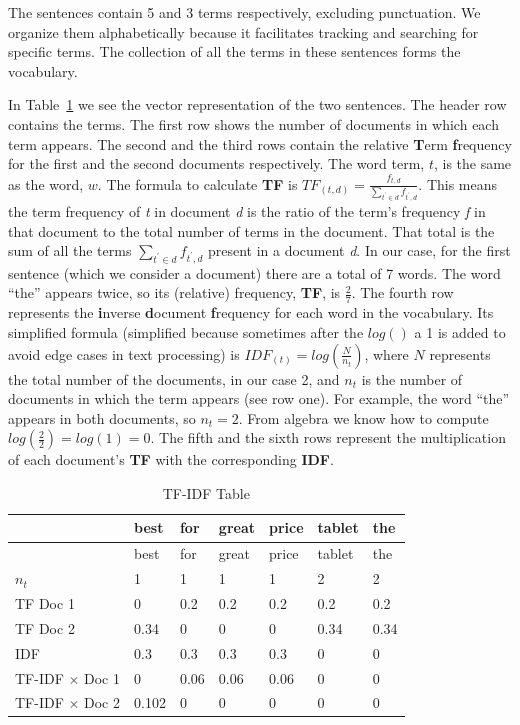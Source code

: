 The sentences contain 5 and 3 terms respectively, excluding punctuation.
We organize them alphabetically because it facilitates tracking and
searching for specific terms. The collection of all the terms in these sentences
forms the vocabulary.

In Table~\ref{tbl-tfidf} we see the vector representation of the two
sentences. The header row contains the terms. The first row shows the
number of documents in which each term appears. The second and the third rows
contain the relative \textbf{T}erm \textbf{f}requency for the first and
the second documents respectively. The word term, \(t\), is the same
as the word, \(w\). The formula to calculate \textbf{TF} is
\(TF_{(t,d)}=\frac{f_{t,d}}{\sum_{t^{'}\in d}f_{t^{'},d}}\). This means
the term frequency of \emph{t} in document \emph{d} is the ratio of
the term's frequency \emph{f} in that document to the total number of
terms in the document. That total is the sum of all the terms
\(\sum_{t^{'}\in d}f_{t^{'},d}\) present in a document
\emph{d}. In our case, for the first sentence (which we consider a
document) there are a total of 7 words. The word ``the'' appears twice,
so its (relative) frequency, \textbf{TF}, is \(\frac{2}{7}\). The fourth
row represents the \textbf{i}nverse \textbf{d}ocument \textbf{f}requency
for each word in the vocabulary. Its simplified formula (simplified
because sometimes after the \(log()\) a 1 is added to avoid edge
cases in text processing) is \(IDF_{(t)}=log(\frac{N}{n_{t}})\), where
\(N\) represents the total number of the documents, in our case 2, and
\(n_{t}\) is the number of documents in which the term appears (see row
one). For example, the word ``the'' appears in both documents, so
\(n_{t}=2\). From algebra we know how to compute
\(log(\frac{2}{2})=log(1)=0\). The fifth and the sixth rows represent
the multiplication of each document's \textbf{TF} with the corresponding
\textbf{IDF}.

\begin{longtable}[]{@{}lllllll@{}}
\caption{TF-IDF Table}\label{tbl-tfidf}\tabularnewline
\toprule\noalign{}
& best & for & great & price & tablet & the \\
\midrule\noalign{}
\endfirsthead
\toprule\noalign{}
& best & for & great & price & tablet & the \\
\midrule\noalign{}
\endhead
\bottomrule\noalign{}
\endlastfoot
\(n_t\) & 1 & 1 & 1 & 1 & 2 & 2 \\
TF Doc 1 & 0 & 0.2 & 0.2 & 0.2 & 0.2 & 0.2 \\
TF Doc 2 & 0.34 & 0 & 0 & 0 & 0.34 & 0.34 \\
IDF & 0.3 & 0.3 & 0.3 & 0.3 & 0 & 0 \\
TF-IDF \(\times\) Doc 1 & 0 & 0.06 & 0.06 & 0.06 & 0 & 0 \\
TF-IDF \(\times\) Doc 2 & 0.102 & 0 & 0 & 0 & 0 & 0 \\
\end{longtable}

